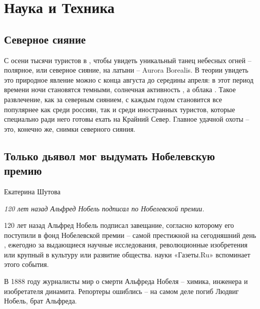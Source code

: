 \chapter{Наука и Техника}
\section{Северное сияние}
С  осени тысячи туристов  в , чтобы увидеть уникальный танец небесных огней -- полярное, или северное сияние, на латыни -- Aurora Borealis.
В теории увидеть это природное явление можно с конца августа до середины апреля: в этот период времени ночи становятся темными, солнечная активность , а облака .
Такое развлечение, как  за северным сиянием, с каждым годом становится все популярнее как среди россиян, так и среди иностранных туристов, которые специально ради него готовы ехать на Крайний Север. Главное  удачной охоты -- это, конечно же, снимки северного сияния.


\section{Только дьявол мог выдумать Нобелевскую премию}
Екатерина Шутова

\textit{120 лет назад Альфред Нобель подписал  по Нобелевской премии.}

120 лет назад Альфред Нобель подписал завещание, согласно которому его  поступили в фонд Нобелевской премии -- самой престижной на сегодняшний день , ежегодно  за выдающиеся научные исследования, революционные изобретения или крупный  в культуру или развитие общества.  науки «Газеты.Ru» вспоминает  этого события.

В 1888 году журналисты  мир о смерти Альфреда Нобеля -- химика, инженера и изобретателя динамита. Репортеры ошиблись -- на самом деле погиб Людвиг Нобель, брат Альфреда.

